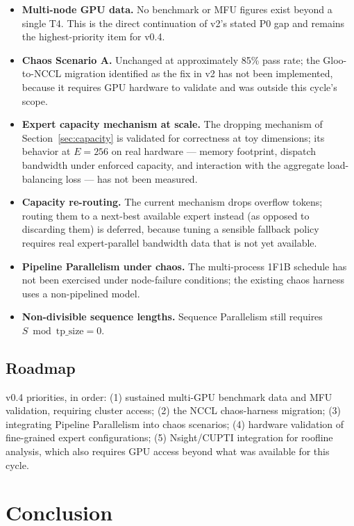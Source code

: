 \documentclass[11pt]{article}
\begin{document}
\begin{itemize}[leftmargin=1.5em]
\item \textbf{Multi-node GPU data.} No benchmark or MFU figures exist
  beyond a single T4. This is the direct continuation of v2's stated P0
  gap and remains the highest-priority item for v0.4.
\item \textbf{Chaos Scenario A.} Unchanged at approximately 85\% pass
  rate; the Gloo-to-NCCL migration identified as the fix in v2 has not
  been implemented, because it requires GPU hardware to validate and was
  outside this cycle's scope.
\item \textbf{Expert capacity mechanism at scale.} The dropping mechanism
  of Section~\ref{sec:capacity} is validated for correctness at toy
  dimensions; its behavior at $E{=}256$ on real hardware --- memory
  footprint, dispatch bandwidth under enforced capacity, and interaction
  with the aggregate load-balancing loss --- has not been measured.
\item \textbf{Capacity re-routing.} The current mechanism drops overflow
  tokens; routing them to a next-best available expert instead (as
  opposed to discarding them) is deferred, because tuning a sensible
  fallback policy requires real expert-parallel bandwidth data that is
  not yet available.
\item \textbf{Pipeline Parallelism under chaos.} The multi-process 1F1B
  schedule has not been exercised under node-failure conditions; the
  existing chaos harness uses a non-pipelined model.
\item \textbf{Non-divisible sequence lengths.} Sequence Parallelism
  still requires $S \bmod \mathrm{tp\_size} = 0$.
\end{itemize}

\subsection{Roadmap}

v0.4 priorities, in order: (1) sustained multi-GPU benchmark data and MFU
validation, requiring cluster access; (2) the NCCL chaos-harness migration;
(3) integrating Pipeline Parallelism into chaos scenarios; (4) hardware
validation of fine-grained expert configurations; (5) Nsight/CUPTI
integration for roofline analysis, which also requires GPU access beyond
what was available for this cycle.

\section{Conclusion}
\end{document}
